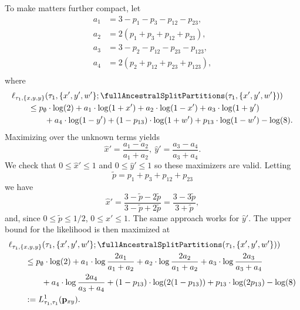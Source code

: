 To make matters further compact, let
\begin{equation}
    \begin{aligned}
        a_{1} &= 3-p_{1}-p_{3}-p_{12}-p_{23}, \\
        a_{2} &= 2(p_{1}+p_{3}+p_{12}+p_{23}), \\
        a_{3} &= 3-p_{2}-p_{12}-p_{23}-p_{123}, \\
        a_{4} &= 2(p_{2}+p_{12}+p_{23}+p_{123}), \\
    \end{aligned}
    \label{eq:a_const}
\end{equation}
where
\begin{equation*}
\begin{split}
&    \ell_{\tau_1,\{x,y,y\}}(\tau_1, \{x',y',w'\}; \fullAncestralSplitPartitions(\tau_1,\{x',y',w'\})) \\
&\qquad \le      p_{\emptyset}  \cdot\log(2)
+ a_{1}\cdot\log(1+x')
+ a_{2}\cdot\log(1-x')
+ a_{3}\cdot\log(1+y') \\
&\qquad\qquad + a_{4}\cdot\log(1-y')
+ (1-p_{13})\cdot\log(1+w')
+ p_{13}\cdot\log(1-w')
- \log(8).
\end{split}
\end{equation*}
Maximizing over the unknown terms yields
$$
\hat{x}' = \frac{a_{1}-a_{2}}{a_{1}+a_{2}}, \ \hat{y}' = \frac{a_{3}-a_{4}}{a_{3}+a_{4}}.
$$
We check that $0 \le \hat{x}' \le 1$ and $0 \le \hat{y}' \le 1$ so these maximizers are valid.
Letting
$$
\tilde{p} = p_{1}+p_{3}+p_{12}+p_{23}
$$
we have
$$
\hat{x}' = \frac{3-\tilde{p} - 2\tilde{p}}{3-\tilde{p}+2\tilde{p}} = \frac{3-3\tilde{p}}{3+\tilde{p}},
$$
and, since $0 \le \tilde{p} \le 1/2$, $0 \le \hat{x}' \le 1$.
The same approach works for $\hat{y}'$.
The upper bound for the likelihood is then maximized at
\begin{align*}
&    \ell_{\tau_1,\{x,y,y\}}(\tau_1, \{x',y',w'\}; \fullAncestralSplitPartitions(\tau_1,\{x',y',w'\})) \\
&\qquad\le      p_{\emptyset}  \cdot\log(2)
+ a_{1}\cdot\log\frac{2a_{1}}{a_{1}+a_{2}}
+ a_{2}\cdot\log\frac{2a_{2}}{a_{1}+a_{2}}
+ a_{3}\cdot\log\frac{2a_{3}}{a_{3}+a_{4}} \\
&\qquad\qquad + a_{4}\cdot\log\frac{2a_{4}}{a_{3}+a_{4}}
+ (1-p_{13})\cdot\log(2(1-p_{13}))
+ p_{13}\cdot\log(2p_{13})
- \log(8) \\
&\qquad := L^{1}_{\tau_1,\tau_1}(\mathbf{p}_{xy}).
\end{align*}

